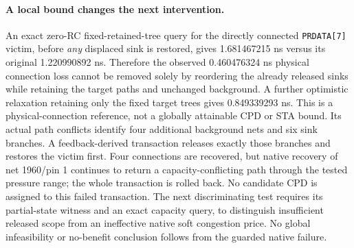 \paragraph{A local bound changes the next intervention.}
An exact zero-RC fixed-retained-tree query for the directly connected \texttt{PRDATA[7]} victim, before \emph{any} displaced sink is restored, gives 1.681467215 ns versus its original 1.220990892 ns. Therefore the observed 0.460476324 ns physical connection loss cannot be removed solely by reordering the already released sinks while retaining the target paths and unchanged background. A further optimistic relaxation retaining only the fixed target trees gives 0.849339293 ns. This is a physical-connection reference, not a globally attainable CPD or STA bound. Its actual path conflicts identify four additional background nets and six sink branches. A feedback-derived transaction releases exactly those branches and restores the victim first. Four connections are recovered, but native recovery of net 1960/pin 1 continues to return a capacity-conflicting path through the tested pressure range; the whole transaction is rolled back. No candidate CPD is assigned to this failed transaction. The next discriminating test requires its partial-state witness and an exact capacity query, to distinguish insufficient released scope from an ineffective native soft congestion price. No global infeasibility or no-benefit conclusion follows from the guarded native failure.
